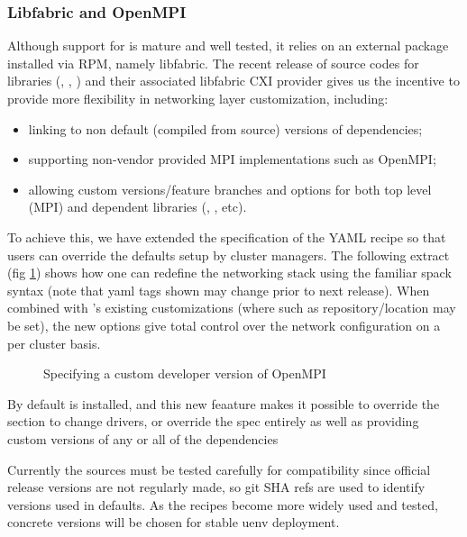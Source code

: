 \subsubsection{Libfabric and OpenMPI}
\label{sec:network-libfabric}

Although support for \craympich is mature and well tested, it relies on an external package installed via RPM, namely libfabric.
The recent release of source codes for \slingshot libraries (, , ) and their associated libfabric CXI provider gives us the incentive to provide more flexibility in networking layer customization, including:
\begin{itemize}
    \item linking \craympich to non default (compiled from source) versions of \slingshot dependencies;
    \item supporting non-vendor provided MPI implementations such as OpenMPI;
    \item allowing custom versions/feature branches and options for both top level (MPI) and dependent libraries (, , etc).
\end{itemize}

To achieve this, we have extended the  specification of the \stackinator YAML recipe so that users can override the defaults setup by cluster managers.
The following extract (fig \ref{lst:openmpi-config}) shows how one can redefine the networking stack using the familiar spack syntax (note that yaml tags shown may change prior to next release).
When combined with \stackinator's existing  customizations (where  such as  repository/location may be set), the new options give total control over the network configuration on a per cluster basis.

\begin{figure}[htp!]
    
    \caption{Specifying a custom developer version of OpenMPI}
    \label{lst:openmpi-config}
\end{figure}

By default \craympich is installed, and this new feaature makes it possible to override the  section to change drivers, or override the  spec entirely as well as providing custom versions of any or all of the dependencies

Currently the \slingshot sources must be tested carefully for compatibility since official release versions are not regularly made, so git SHA refs are used to identify versions used in \stackinator defaults.
As the recipes become more widely used and tested, concrete versions will be chosen for stable uenv deployment.
